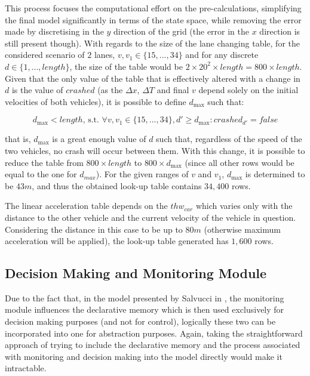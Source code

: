 This process focuses the computational effort on the pre-calculations, simplifying the final model significantly in terms of the state space, while removing the error made by discretising in the $y$ direction of the grid (the error in the $x$ direction is still present though). With regards to the size of the lane changing table, for the considered scenario of $2$ lanes, $v, v_1 \in \{15,...,34\}$ and for any discrete $d \in \{1,...,length\}$, the size of the table would be $2\times 20^2 \times length = 800 \times length$. Given that the only value of the table that is effectively altered with a change in $d$ is the value of $crashed$ (as the $\Delta x$, $\Delta T$ and final $v$ depend solely on the initial velocities of both vehicles), it is possible to define $d_{\max}$ such that:

\begin{equation}
d_{\max} < length\text{, s.t. }\forall v, v_1 \in \{15,...,34\}, d' \geq d_{\max}: crashed_{d'} = false
\end{equation}

that is, $d_{\max}$ is a great enough value of $d$ such that, regardless of the speed of the two vehicles, no crash will occur between them. With this change, it is possible to reduce the table from $800\times length$ to $800\times d_{\max}$ (since all other rows would be equal to the one for $d_{max}$). For the given ranges of $v$ and $v_1$, $d_{\max}$ is determined to be $43m$, and thus the obtained look-up table contains $34,400$ rows.

The linear acceleration table depends on the $thw_{car}$ which varies only with the distance to the other vehicle and the current velocity of the vehicle in question. Considering the distance in this case to be up to $80m$ (otherwise maximum acceleration will be applied), the look-up table generated has $1,600$ rows.

\subsection{Decision Making and Monitoring Module}

Due to the fact that, in the model presented by Salvucci in \cite{salvucci_1}, the monitoring module influences the declarative memory which is then used exclusively for decision making purposes (and not for control), logically these two can be incorporated into one for abstraction purposes. Again, taking the straightforward approach of trying to include the declarative memory and the process associated with monitoring and decision making into the model directly would make it intractable. 

